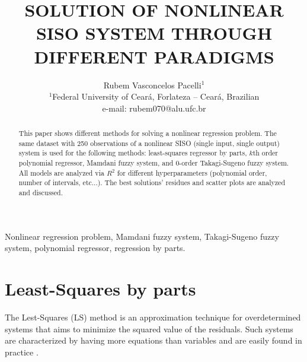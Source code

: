 \documentclass[english]{sobraep}
\title{SOLUTION OF NONLINEAR SISO SYSTEM THROUGH DIFFERENT PARADIGMS}
\author{Rubem Vasconcelos Pacelli$^{1}$\\
	\normalsize $^{1}$Federal University of Ceará, Forlateza -- Ceará, Brazilian\\
	\normalsize e-mail: rubem070@alu.ufc.br
}
\begin{document}
\maketitle

\begin{abstract}
	This paper shows different methods for solving a nonlinear regression problem. The same dataset with 250 observations of a nonlinear SISO (single input, single output) system is used for the following methods: least-squares regressor by parts, $k$th order polynomial regressor, Mamdani fuzzy system, and 0-order Takagi-Sugeno fuzzy system. All models are analyzed via $R^2$ for different hyperparameters (polynomial order, number of intervals, etc...). The best solutions' residues and scatter plots are analyzed and discussed.
\end{abstract}

\begin{keywords}
	Nonlinear regression problem, Mamdani fuzzy system, Takagi-Sugeno fuzzy system, polynomial regressor, regression by parts. 
\end{keywords}






\section{Least-Squares by parts}

The Lest-Squares (LS) method is an approximation technique for overdetermined systems that aims to minimize the squared value of the residuals. Such systems are characterized by having more equations than variables and are easily found in practice \cite{kay1993fundamentals}.
\end{document}
